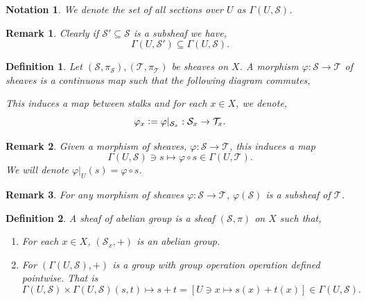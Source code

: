 \documentclass{article}
\newtheorem{definition}{Definition}[section]
\newtheorem{notation}{Notation}[section]
\newtheorem{remark}{Remark}[section]
\newcommand{\defeq}{\vcentcolon=}
\begin{document}
\begin{notation}
  We denote the set of all sections over $U$ as $\Gamma(U,\mathcal{S})$. 
\end{notation}

\begin{remark}
  Clearly if $\mathcal{S}'\subseteq \mathcal{S}$ is a subsheaf we have,
  \begin{equation*}
    \Gamma(U,\mathcal{S}')\subseteq\Gamma(U,\mathcal{S}).
  \end{equation*}
\end{remark}

\begin{definition}
  Let $(\mathcal{S},\pi_{\mathcal{S}}),(\mathcal{T},\pi_{\mathcal{T}})$ be sheaves on $X$. A morphism $\varphi:\mathcal{S}\to\mathcal{T}$ of sheaves is a continuous map such that the following diagram commutes,
  \begin{center}
  \end{center}
  This induces a map between stalks and for each $x\in X$, we denote,
  \begin{equation*}
    \varphi_x \defeq \varphi|_{\mathcal{S}_x}:\mathcal{S}_x\to\mathcal{T}_x.
  \end{equation*}
\end{definition}

\begin{remark}
  Given a morphism of sheaves, $\varphi:\mathcal{S}\to\mathcal{T}$, this induces a map 
  \begin{equation*}
    \Gamma(U,\mathcal{S})\ni s\mapsto\varphi\circ s\in\Gamma(U,\mathcal{T}).
  \end{equation*}
  We will denote $\varphi|_U(s) = \varphi\circ s$.
\end{remark}

\begin{remark}
  For any morphism of sheaves $\varphi:\mathcal{S}\to\mathcal{T}$, $\varphi(\mathcal{S})$ is a subsheaf of $\mathcal{T}$.
\end{remark}

\begin{definition}
  A sheaf of abelian group is a sheaf $(\mathcal{S},\pi)$ on $X$ such that,
  \begin{enumerate}
    \item For each $x\in X$, $(\mathcal{S}_x,+)$ is an abelian group.
    \item For $(\Gamma(U,\mathcal{S}),+)$ is a group with group operation operation defined pointwise. That is 
    \begin{equation*}
      \Gamma(U,\mathcal{S})\times\Gamma(U,\mathcal{S})(s,t)\mapsto s+t = [U\ni x\mapsto s(x)+t(x)]\in \Gamma(U,\mathcal{S}).
    \end{equation*}
  \end{enumerate}
\end{definition}
\end{document}
